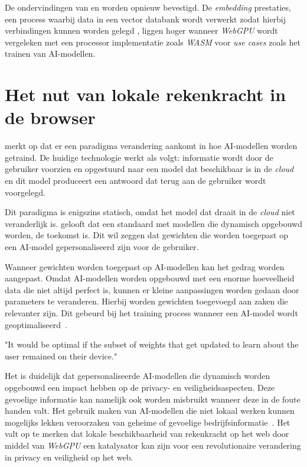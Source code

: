 \bigbreak{}

De ondervindingen van \textcite{Wallez2023} en \textcite{Radin2021} worden opnieuw bevestigd. De \textit{embedding} prestaties, een process waarbij data in een vector databank wordt verwerkt zodat hierbij verbindingen kunnen worden gelegd \autocite{Cloudflare2024, Cloudflare2024a, Huyen2023}, liggen hoger wanneer \textit{WebGPU} wordt vergeleken met een processor implementatie zoals \textit{WASM} voor \textit{use cases} zoals het trainen van AI-modellen.

\break{}

\section{Het nut van lokale rekenkracht in de browser} 

\textcite{Fleetwood2022} merkt op dat er een paradigma verandering aankomt in hoe AI-modellen worden getraind. De huidige technologie werkt als volgt: informatie wordt door de gebruiker voorzien en opgestuurd naar een model dat beschikbaar is in de \textit{cloud} en dit model produceert een antwoord dat terug aan de gebruiker wordt voorgelegd.

\bigbreak{}

Dit paradigma is enigszins statisch, omdat het model dat draait in de \textit{cloud} niet veranderlijk is. \textcite{Fleetwood2022} gelooft dat een standaard met modellen die dynamisch opgebouwd worden, de toekomst is. Dit wil zeggen dat gewichten die worden toegepast op een AI-model gepersonaliseerd zijn voor de gebruiker. 

\bigbreak{}

Wanneer gewichten worden toegepast op AI-modellen kan het gedrag worden aangepast. Omdat AI-modellen worden opgebouwd met een enorme hoeveelheid data die niet altijd perfect is, kunnen er kleine aanpassingen worden gedaan door parameters te veranderen. Hierbij worden gewichten toegevoegd aan zaken die relevanter zijn. Dit gebeurd bij het training process wanneer een AI-model wordt geoptimaliseerd~\autocite{Hubbard2024}.

\begin{displayquote}
    "It would be optimal if the subset of weights that get updated to learn about the user remained on their device."
\end{displayquote}

Het is duidelijk dat gepersonaliseerde AI-modellen die dynamisch worden opgebouwd een impact hebben op de privacy- en veiligheidsaspecten. Deze gevoelige informatie kan namelijk ook worden misbruikt wanneer deze in de foute handen valt. Het gebruik maken van AI-modellen die niet lokaal werken kunnen mogelijks lekken veroorzaken van geheime of gevoelige bedrijfsinformatie~\autocite{Wiggers2023, Sabin2023}. Het valt op te merken dat lokale beschikbaarheid van rekenkracht op het web door middel van \textit{WebGPU} een katalysator kan zijn voor een  revolutionaire verandering in privacy en veiligheid op het web.

